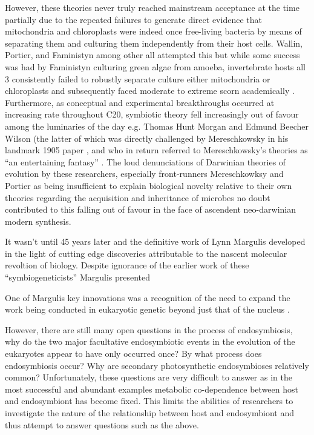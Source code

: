 However, these theories never truly reached mainstream acceptance at the time
partially due to the repeated failures to generate direct evidence that mitochondria
and chloroplasts were indeed once free-living bacteria by means of separating them
and culturing them independently from their host cells.  Wallin, Portier, and Faministyn
among other all attempted this but while some success was had by Faministyn
culturing green algae from amoeba, invertebrate hosts all 3 consistently failed
to robustly separate culture either mitochondria or chloroplasts and subsequently
faced moderate to extreme scorn academically \citep{Archibald2014}.
Furthermore, as conceptual and experimental breakthroughs occurred at increasing
rate throughout C20, symbiotic theory fell increasingly out of favour among
the luminaries of the day e.g. Thomas Hunt Morgan and Edmund Beecher Wilson (the
latter of which was directly challenged by Mereschkowsky in his landmark 1905
paper \citep{Mereschkowsky1905,Martin1999a}, and who in return referred to Mereschkowsky's
theories as ``an entertaining fantasy'' \citep{Wilson1928,Martin1999a}
\citep{Archibald2014}. The loud denunciations of Darwinian theories of evolution
by these researchers, especially front-runners Mereschkowksy and Portier as being
insufficient to explain biological novelty relative to their own theories
regarding the acquisition and inheritance of microbes \citep{Sapp2002} no doubt
contributed to this falling out of favour in the face of ascendent neo-darwinian
modern synthesis.


It wasn't until 45 years later and the definitive work of Lynn Margulis \citep{Sagan1967} 
developed in the light of cutting edge discoveries attributable to the nascent
molecular revoltion of biology. Despite ignorance of the earlier work of these 
``symbiogeneticists'' \citep{Archibald2014} Margulis presented 


One of Margulis key innovations was a recognition of the need to expand the
work being conducted in eukaryotic genetic beyond just that of the nucleus
\citep{Archibald2002}.





However, there are still many open questions in the process of endosymbiosis,
why do the two major facultative endosymbiotic events in the evolution of the eukaryotes
appear to have only occurred once? By what process does endosymbiosis occur?
Why are secondary photosynthetic endosymbioses relatively common?
Unfortunately, these questions are very difficult to answer as in the most successful
and abundant examples metabolic co-dependence between host and endosymbiont has become
fixed.  This limits the abilities of researchers to investigate the nature of the
relationship between host and endosymbiont and thus attempt to answer questions
such as the above. 

